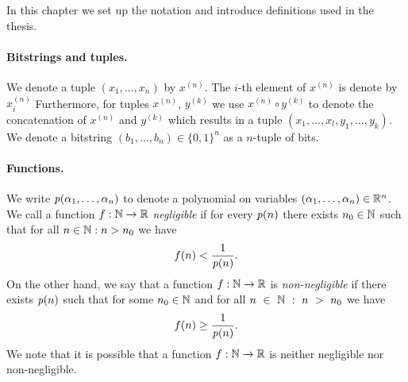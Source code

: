 %
In this chapter we set up the notation and introduce definitions used in the thesis.


\paragraph{Bitstrings and tuples.} We denote a tuple $(x_1, \dotsc, x_n)$ by $x^{(n)}$. The $i$-th element of $x^{(n)}$ is denote by $x^{(n)}_i$
Furthermore, for tuples $x^{(n)}$, $y^{(k)}$ we use $x^{(n)} \circ y^{(k)}$ to denote the concatenation of $x^{(n)}$ and $y^{(k)}$ which results in
a tuple $(x_1, \dotsc, x_l, y_1, \dotsc, y_k)$.
We denote a bitstring $(b_1, \dotsc, b_n) \in \{0,1\}^{n}$ as a $n$-tuple of bits.

\paragraph{Functions.}
We write $\operatorname{\mathit{p}}(\alpha_1, \dots, \alpha_n)$ to denote a polynomial on variables $(\alpha_1, \dots, \alpha_n) \in \mathbb{R}^n$.
We call a function $f: \mathbb{N} \rightarrow \mathbb{R}$ \textit{negligible} if for every $\operatorname{\mathit{p}}(n)$
there exists $n_0 \in \mathbb{N}$ such that for all $n \in \mathbb{N} : n > n_0$ we have
\begin{align*}
f(n) < \frac{1}{\operatorname{\mathit{p}}(n)}.
\end{align*}
On the other hand, we say that a function $f: \mathbb{N} \rightarrow \mathbb{R}$ is \textit{non-negligible} if
there exists $\operatorname{\mathit{p}}(n)$ such that for some $n_0 \in \mathbb{N}$ and for all $n~\in~\mathbb{N}~:~n~>~n_0$ we have
\begin{align*}
  f(n) \geq \frac{1}{\operatorname{\mathit{p}}(n)}.
\end{align*}
We note that it is possible that a function $f:\mathbb{N} \rightarrow \mathbb{R}$ is neither negligible nor non-negligible.

